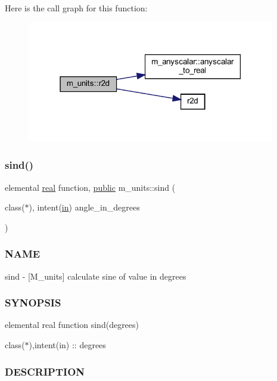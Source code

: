 Here is the call graph for this function\+:
\nopagebreak
\begin{figure}[H]
\begin{center}
\leavevmode
\includegraphics[width=307pt]{namespacem__units_a2fbd26061a0f20c800791796ce183475_cgraph}
\end{center}
\end{figure}
\mbox{\label{namespacem__units_afe7f79e1832a71630c0f83602a309aef}} 
\subsubsection{\texorpdfstring{sind()}{sind()}}
{\footnotesize\ttfamily elemental \hyperlink{read__watch_83_8txt_abdb62bde002f38ef75f810d3a905a823}{real} function, \hyperlink{M__stopwatch_83_8txt_a2f74811300c361e53b430611a7d1769f}{public} m\+\_\+units\+::sind (\begin{DoxyParamCaption}\item[{class($\ast$), intent(\hyperlink{M__journal_83_8txt_afce72651d1eed785a2132bee863b2f38}{in})}]{angle\+\_\+in\+\_\+degrees }\end{DoxyParamCaption})}



\subsubsection*{N\+A\+ME}

sind -\/ \mbox{[}M\+\_\+units\mbox{]} calculate sine of value in degrees \subsubsection*{S\+Y\+N\+O\+P\+S\+IS}

elemental real function sind(degrees)

class($\ast$),intent(in) \+:\+: degrees \subsubsection*{D\+E\+S\+C\+R\+I\+P\+T\+I\+ON}

